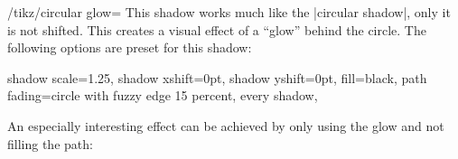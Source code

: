 \begin{key}{/tikz/circular glow=}
    This shadow works much like the |circular shadow|, only it is not shifted.
    This creates a visual effect of a ``glow'' behind the circle. The following
    options are preset for this shadow:
\begin{codeexample}
  shadow scale=1.25, shadow xshift=0pt, shadow yshift=0pt,
  fill=black, path fading={circle with fuzzy edge 15 percent},
  every shadow,
\end{codeexample}

\begin{codeexample}[preamble={\usetikzlibrary{shadows}}]
\end{codeexample}

\begin{codeexample}[preamble={\usetikzlibrary{shadows}}]
\end{codeexample}

\begin{codeexample}[preamble={\usetikzlibrary{shadows}}]
\end{codeexample}
    An especially interesting effect can be achieved by only using the glow and
    not filling the path:
\begin{codeexample}[preamble={\usetikzlibrary{shadows}}]
\end{codeexample}
\end{key}


